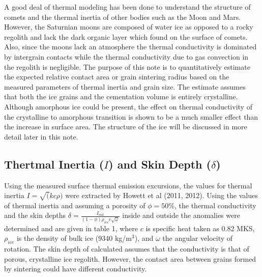 \documentclass[11pt]{article} %
\begin{document}
\begin{itemize}
	A good deal of thermal modeling has been done to understand the structure of comets and the thermal inertia of other bodies such as the Moon and Mars. However, the Saturnian moons are composed of water ice as opposed to a rocky regolith and lack the dark organic layer which found on the surface of comets. Also, since the moons lack an atmosphere the thermal conductivity is dominated by intergrain contacts while the thermal conductivity due to gas convection in the regolith is negligible. The purpose of this note is to quantitatively estimate the expected relative contact area or grain sintering radius based on the measured parameters of thermal inertia and grain size. The estimate assumes that both the ice grains and the cementation volume is entirely crystalline. Although amorphous ice could be present, the effect on thermal conductivity of the crystalline to amorphous transition is shown to be a much smaller effect than the increase in surface area. The structure of the ice will be discussed in more detail later in this note. 
	

\subsection{Thertmal Inertia ($I$) and Skin Depth ($\delta$)}

		Using the measured surface thermal emission excursions, the values for thermal inertia $I=\sqrt(kc\rho)$ were extracted by Howett et al (2011, 2012). Using the values of thermal inertia and assuming a porosity of $\phi = 50\%$, the thermal conductivity and the skin depths $\delta = \frac{I_{out}}{(1-\phi)\rho_{ice} c \sqrt{\omega}}$ inside and outside the anomalies were determined and are given in table 1, where $c$ is specific heat taken as 0.82 MKS, $\rho_{ice}$ is the density of bulk ice (9340 kg/m$^{3}$), and $\omega$ the angular velocity of rotation. The skin depth of calculated assumes that the conductivity is that of porous, crystalline ice regolith. However, the contact area between grains formed by sintering could have different conductivity. 


\end{itemize}
\end{document}
